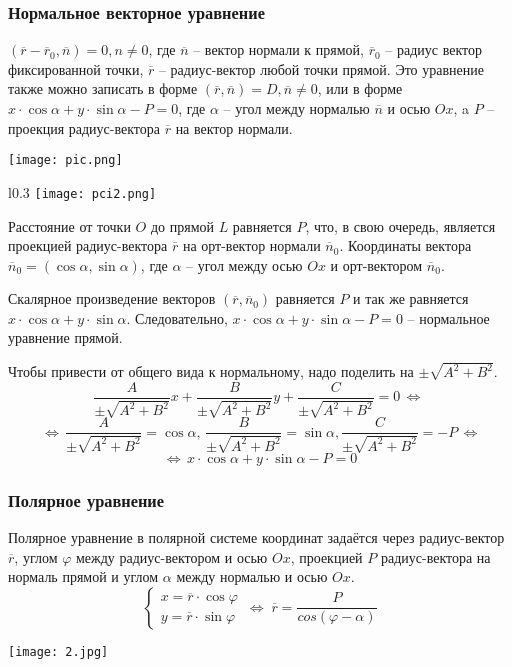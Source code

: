 \documentclass{article}
\begin{document}
\subsubsection{Нормальное векторное уравнение}
$(\overline{r} - \overline{r}_0, \overline{n}) = 0, n \neq 0$, где $\overline{n}$ -- вектор нормали к прямой, $\overline{r}_0$ -- радиус вектор
фиксированной точки, $\overline{r}$ -- радиус-вектор любой точки прямой. Это уравнение также можно записать в форме $(\overline{r}, \overline{n}) = D, \overline{n} \neq 0$, или в форме $x\cdot\cos\alpha+y\cdot\sin\alpha-P=0$, где $\alpha$ -- угол между нормалью $\overline{n}$ и осью $Ox$, a $P$ -- проекция радиус-вектора $\overline{r}$ на вектор нормали.
\newline
\newpage
\begin{center}
    \texttt{[image: pic.png]}
\end{center}
\begin{wrapfigure}{l}{0.3\textwidth}
    \centering
    \texttt{[image: pci2.png]}
\end{wrapfigure}

Расстояние от точки $O$ до прямой $L$ равняется $P$, что, в свою очередь, является проекцией радиус-вектора $\overline{r}$ на орт-вектор нормали $\overline{n}_0$. Координаты вектора $\overline{n}_0=(\cos\alpha,\sin\alpha)$, где $\alpha$ -- угол между осью $Ox$ и орт-вектором $\overline{n}_0$.

Скалярное произведение векторов $(\overline{r},\overline{n}_0)$ равняется $P$ и так же равняется $x\cdot\cos\alpha+y\cdot\sin\alpha$. Следовательно, $x\cdot\cos\alpha+y\cdot\sin\alpha-P=0$ -- нормальное уравнение прямой.

Чтобы привести от общего вида к нормальному, надо поделить на $\pm\sqrt{A^2+B^2}$.
$$ \frac{A}{\pm\sqrt{A^2+B^2}}x+\frac{B}{\pm\sqrt{A^2+B^2}}y+\frac{C}{\pm\sqrt{A^2+B^2}}=0\,\Leftrightarrow\, $$
$$\,\Leftrightarrow\,\frac{A}{\pm\sqrt{A^2+B^2}} = \cos\alpha,\,\frac{B}{\pm\sqrt{A^2+B^2}}=\sin\alpha, \frac{C}{\pm\sqrt{A^2+B^2}}=-P\,\Leftrightarrow$$
$$ \Leftrightarrow\,x\cdot\cos\alpha+y\cdot\sin\alpha-P=0$$
\newpage
\subsubsection{Полярное уравнение}
Полярное уравнение в полярной системе координат задаётся через радиус-вектор $\overline{r}$, углом $\varphi$ между радиус-вектором и осью $Ox$, проекцией $P$ радиус-вектора на нормаль прямой и углом $\alpha$ между нормалью и осью $Ox$.
$$ \begin{cases} x=\overline{r}\cdot\cos\varphi \\y=\overline{r}\cdot\sin\varphi \end{cases}\,\Leftrightarrow\;\overline{r}=\frac{P}{cos(\varphi-\alpha)} $$
\begin{center}
\texttt{[image: 2.jpg]}
\end{center}
\end{document}
